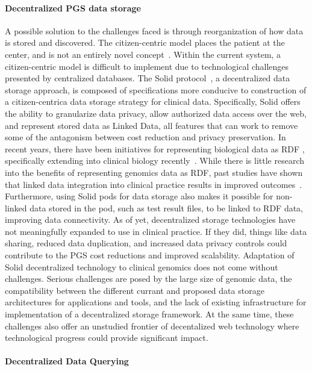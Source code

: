 \documentclass[a4paper,11pt]{article}
\begin{document}
\begin{refsection}
\paragraph{Decentralized PGS data storage}
A possible solution to the challenges faced is through reorganization of how data is stored and discovered. 
The citizen-centric model places the patient at the center, and is not an entirely novel concept~\cite{brands_patient-centered_2022}.
Within the current system, a citizen-centric model is difficult to implement due to technological challenges presented by centralized databases.
The Solid protocol~\cite{solid}, a decentralized data storage approach, is composed of specifications more conducive to construction of a citizen-centrica data storage strategy for clinical data.
Specifically, Solid offers the ability to granularize data privacy, allow authorized data access over the web, and represent stored data as Linked Data, all features that can work to remove some of the antagonism between cost reduction and privacy preservation.
In recent years, there have been initiatives for representing biological data as RDF \cite{sib_rdf_2024}, specifically extending into clinical biology recently~\cite{sphn_rdf_2023}. 
While there is little research into the benefits of representing genomics data as RDF, past studies have shown that linked data integration into clinical practice results in improved outcomes~\cite{farinelli_linked_2015}.
Furthermore, using Solid pods for data storage also makes it possible for non-linked data stored in the pod, such as test result files, to be linked to RDF data, improving data connectivity.
As of yet, decentralized storage technologies have not meaningfully expanded to use in clinical practice.
If they did, things like data sharing, reduced data duplication, and increased data privacy controls could contribute to the PGS cost reductions and improved scalability.
Adaptation of Solid decentralized technology to clinical genomics does not come without challenges.
Serious challenges are posed by the large size of genomic data, the compatibility between the different currant and proposed data storage architectures for applications and tools, and the lack of existing infrastructure for implementation of a decentralized storage framework. %
At the same time, these challenges also offer an unstudied frontier of decentalized web technology where technological progress could provide significant impact. %

\paragraph{Decentralized Data Querying} 


\end{refsection}
\end{document}
